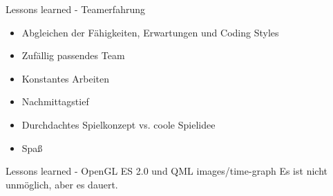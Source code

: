 \begin{frame}{Lessons learned - Teamerfahrung}
	\onetoone
	{
	\begin{itemize}
		\item Abgleichen der Fähigkeiten, Erwartungen und Coding Styles
		\item Zufällig passendes Team
		\item Konstantes Arbeiten
	\end{itemize}
	}
	{
	\begin{itemize}
		\item Nachmittagstief
		\item Durchdachtes Spielkonzept vs. coole Spielidee
		\item Spaß
	\end{itemize}
	}
	\begin{figure}
		\centering
	\end{figure}
\end{frame}

\slidegraphic
{Lessons learned - OpenGL ES 2.0 und QML}
{images/time-graph}
{Es ist nicht unmöglich, aber es dauert.}


%


